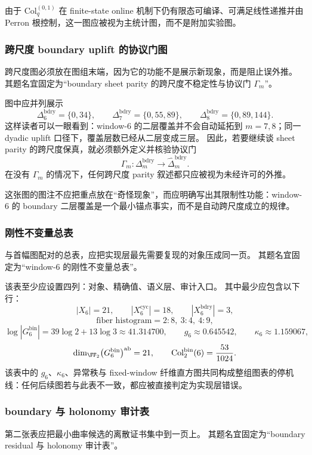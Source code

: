 由于 \(\mathrm{Col}_q^{(0,1)}\) 在 finite-state online 机制下仍有限态可编译、可满足线性递推并由 Perron 根控制，这一图应被视为主统计图，而不是附加实验图。

\subsubsection{跨尺度 boundary uplift 的协议门图}\label{subsubsec:typed-address-biaxial-completion-window6-figure-crossscale-gate}
跨尺度图必须放在图组末端，因为它的功能不是展示新现象，而是阻止误外推。
其题名宜固定为“boundary sheet parity 的跨尺度不稳定性与协议门 \(\Gamma_m\)”。

图中应并列展示
\[
\Delta_6^{\mathrm{bdry}}=\{0,34\},
\qquad
\Delta_7^{\mathrm{bdry}}=\{0,55,89\},
\qquad
\Delta_8^{\mathrm{bdry}}=\{0,89,144\}.
\]
这样读者可以一眼看到：window-\(6\) 的二层覆盖并不会自动延拓到 \(m=7,8\)；同一 dyadic uplift 口径下，覆盖层数已经从二层变成三层。
因此，若要继续谈 sheet parity 的跨尺度保真，就必须额外定义并核验协议门
\[
\Gamma_m:\Delta_m^{\mathrm{bdry}}\to \widehat{\Delta}_m^{\mathrm{bdry}}.
\]
在没有 \(\Gamma_m\) 的情况下，任何跨尺度 parity 叙述都只应被视为未经许可的外推。

这张图的图注不应把重点放在“奇怪现象”，而应明确写出其限制性功能：window-\(6\) 的 boundary 二层覆盖是一个最小锚点事实，而不是自动跨尺度成立的规律。

\subsubsection{刚性不变量总表}\label{subsubsec:typed-address-biaxial-completion-window6-table-rigid-invariants}
与首幅图配对的总表，应把实现层最先需要复现的对象压成同一页。
其题名宜固定为“window-\(6\) 的刚性不变量总表”。

该表至少应设置四列：对象、精确值、语义层、审计入口。
其中最少应包含以下行：
\[
|X_6|=21,
\qquad
|X_6^{\mathrm{cyc}}|=18,
\qquad
|X_6^{\mathrm{bdry}}|=3,
\]
\[
\text{fiber histogram}=2{:}8,\ 3{:}4,\ 4{:}9,
\]
\[
\log |G_6^{\mathrm{bin}}|
=
39\log 2+13\log 3
\approx 41.314700,
\qquad
g_6\approx 0.645542,
\qquad
\kappa_6\approx 1.159067,
\]
\[
\dim_{\FF_2}\bigl(G_6^{\mathrm{bin}}\bigr)^{\mathrm{ab}}=21,
\qquad
\mathrm{Col}_2^{\mathrm{bin}}(6)=\frac{53}{1024}.
\]
该表中的 \(g_6\)、\(\kappa_6\)、异常秩与 fixed-window 纤维直方图共同构成整组图表的停机线：任何后续图若与此表不一致，都应被直接判定为实现层错误。

\subsubsection{boundary 与 holonomy 审计表}\label{subsubsec:typed-address-biaxial-completion-window6-table-boundary-holonomy}
第二张表应把最小曲率候选的离散证书集中到一页上。
其题名宜固定为“boundary residual 与 holonomy 审计表”。

